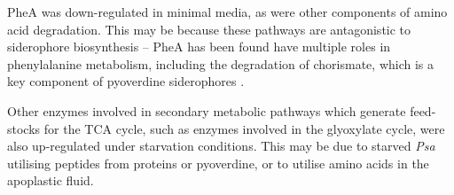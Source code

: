 PheA was down-regulated in minimal media, as were other components of amino acid degradation. This may be because these pathways are antagonistic to siderophore biosynthesis -- PheA has been found have multiple roles in phenylalanine metabolism, including the degradation of chorismate, which is a key component of pyoverdine siderophores \citep{Molina-2008,Cezard2015-ji}.

Other enzymes involved in secondary metabolic pathways which generate feed-stocks for the TCA cycle, such as enzymes involved in the glyoxylate cycle, were also up-regulated under starvation conditions. This may be due to starved \textit{Psa} utilising peptides from proteins or pyoverdine, or to utilise amino acids in the apoplastic fluid.
\newline

